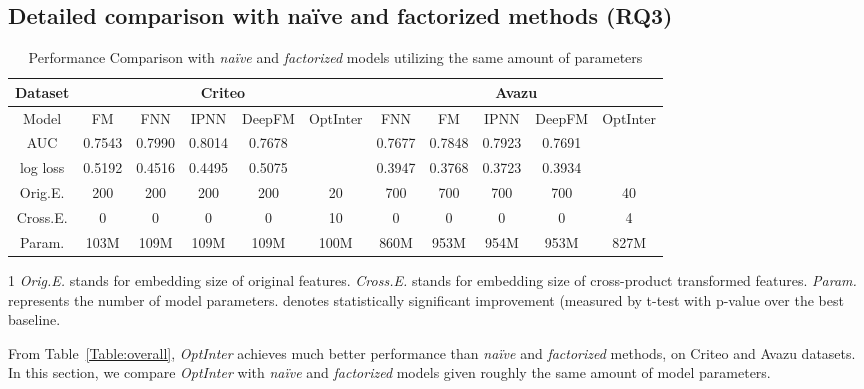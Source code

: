 \documentclass[conference]{IEEEtran}
\begin{document}
 \subsection{Detailed comparison with naïve and factorized methods (RQ3)}
\label{sec:same_budget}


\begin{table*}[!htbp]
    \renewcommand\arraystretch{1.05}
	\centering
	\caption{Performance Comparison with \emph{naïve} and \emph{factorized} models utilizing the same amount of parameters}
	\begin{tabular}{c|cccc|c|cccc|c}
		\hline
		  Dataset & \multicolumn{5}{c|}{Criteo} & \multicolumn{5}{c}{Avazu} \\
		\hline
		  Model         & FM        & FNN       & IPNN      & DeepFM    & OptInter      & FNN      & FM        & IPNN      & DeepFM    & OptInter \\
		\hline
		  AUC           & 0.7543    & 0.7990    & 0.8014    & 0.7678    &      & 0.7677    & 0.7848    & 0.7923    & 0.7691    &  \\
		  log loss      & 0.5192    & 0.4516    & 0.4495    & 0.5075    &      & 0.3947    & 0.3768    & 0.3723    & 0.3934    &  \\
		  Orig.E.       & 200       & 200       & 200       & 200       & 20              & 700     & 700       & 700       & 700       & 40 \\
		  Cross.E.       & 0         & 0         & 0         & 0         & 10              & 0       & 0         & 0         & 0         & 4 \\
		  Param.        & 103M      & 109M      & 109M      & 109M      & 100M            & 860M    & 953M      & 954M      & 953M      & 827M \\
		\hline
	\end{tabular}
	\begin{tablenotes}
    \footnotesize
    \item[1] \textit{Orig.E.} stands for embedding size of original features. \textit{Cross.E.} stands for embedding size of cross-product transformed features. \textit{Param.} represents the number of model parameters.  denotes statistically significant improvement (measured by t-test with p-value  over the best baseline. 
    \end{tablenotes}
	\label{Table:same_budget}
\end{table*}

From Table~\ref{Table:overall}, \textit{OptInter} achieves much better performance than \emph{naïve} and \emph{factorized} methods,  on Criteo and Avazu datasets.
In this section, we compare \textit{OptInter} with \emph{naïve} and \emph{factorized} models given roughly the same amount of model parameters. 
\end{document}
